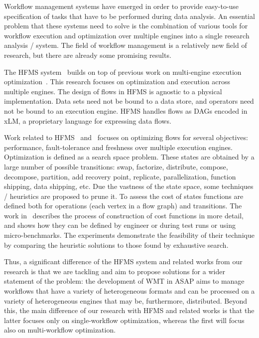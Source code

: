 \documentclass[12pt,openany,onecolumn]{book}
\begin{document}
Workflow management systems have emerged in order to provide easy-to-use specification of tasks that have to be performed during data analysis. An essential problem that these systems need to solve is the combination of various tools for workflow execution and optimization over multiple engines into a single research analysis / system. The field of workflow management is a relatively new field of research, but there are already some promising results.

The HFMS system~\cite{6544907} builds on top of previous work on multi-engine execution optimization~\cite{Simitsis:2012:OAD:2213836.2213963}. This research focuses on optimization and execution across multiple engines.
The design of flows in HFMS is agnostic to a physical implementation. Data sets need not be bound to a data store, and operators need not be bound to an execution engine. HFMS handles flows as DAGs encoded in xLM, a proprietary language for expressing data flows.

Work related to HFMS~\cite{5447816} and~\cite{Simitsis:2012:OAD:2213836.2213963} focuses on optimizing flows for several objectives: performance, fault-tolerance and freshness over multiple execution engines.
Optimization is defined as a search space problem. These states are obtained by a large number of possible transitions: swap, factorize, distribute, compose, decompose, partition, add recovery point, replicate, parallelization, function shipping, data shipping, etc. Due the vastness of the state space, some techniques / heuristics are proposed to prune it.
To assess the cost of states functions are defined both for operations (each vertex in a flow graph) and transitions. The work in~\cite{Simitsis:2013:XPA:2463676.2465247} describes the process of construction of cost functions in more detail, and shows how they can be defined by engineer or during test runs or using micro-benchmarks.
The experiments demonstrate the feasibility of their technique by comparing the heuristic solutions to those found by exhaustive search.

Thus, a significant difference of the HFMS system and related works from our research is that we are tackling and aim to propose solutions for a wider statement of the problem:  the development of WMT in  ASAP  aims to manage workflows that have a variety of heterogeneous formats and can be processed on a variety of heterogeneous engines that may be, furthermore, distributed. Beyond this, the main difference of our research with HFMS and related works is that the latter focuses only on single-workflow optimization, whereas  the first will focus also on multi-workflow optimization. %
\end{document}
